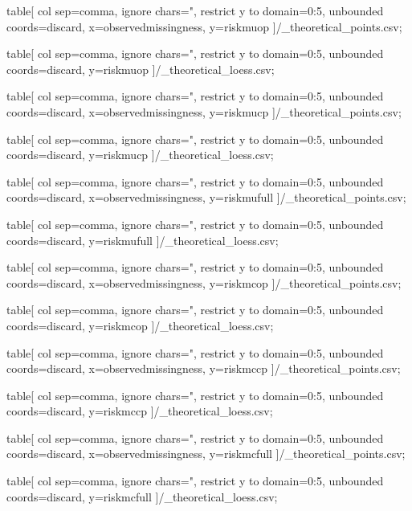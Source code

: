 
\edef\pointsfile{\tabledir/\scenario_theoretical_points.csv}
\edef\loessfile{\tabledir/\scenario_theoretical_loess.csv}

table[
  col sep=comma,
  ignore chars={"},
  restrict y to domain=0:5,
  unbounded coords=discard,
  x=observedmissingness,
  y=riskmuop
]{\pointsfile};

table[
  col sep=comma,
  ignore chars={"},
  restrict y to domain=0:5,
  unbounded coords=discard,
  y=riskmuop
]{\loessfile};

table[
  col sep=comma,
  ignore chars={"},
  restrict y to domain=0:5,
  unbounded coords=discard,
  x=observedmissingness,
  y=riskmucp
]{\pointsfile};

table[
  col sep=comma,
  ignore chars={"},
  restrict y to domain=0:5,
  unbounded coords=discard,
  y=riskmucp
]{\loessfile};

table[
  col sep=comma,
  ignore chars={"},
  restrict y to domain=0:5,
  unbounded coords=discard,
  x=observedmissingness,
  y=riskmufull
]{\pointsfile};

table[
  col sep=comma,
  ignore chars={"},
  restrict y to domain=0:5,
  unbounded coords=discard,
  y=riskmufull
]{\loessfile};

table[
  col sep=comma,
  ignore chars={"},
  restrict y to domain=0:5,
  unbounded coords=discard,
  x=observedmissingness,
  y=riskmcop
]{\pointsfile};

table[
  col sep=comma,
  ignore chars={"},
  restrict y to domain=0:5,
  unbounded coords=discard,
  y=riskmcop
]{\loessfile};

table[
  col sep=comma,
  ignore chars={"},
  restrict y to domain=0:5,
  unbounded coords=discard,
  x=observedmissingness,
  y=riskmccp
]{\pointsfile};

table[
  col sep=comma,
  ignore chars={"},
  restrict y to domain=0:5,
  unbounded coords=discard,
  y=riskmccp
]{\loessfile};

table[
  col sep=comma,
  ignore chars={"},
  restrict y to domain=0:5,
  unbounded coords=discard,
  x=observedmissingness,
  y=riskmcfull
]{\pointsfile};

table[
  col sep=comma,
  ignore chars={"},
  restrict y to domain=0:5,
  unbounded coords=discard,
  y=riskmcfull
]{\loessfile};
